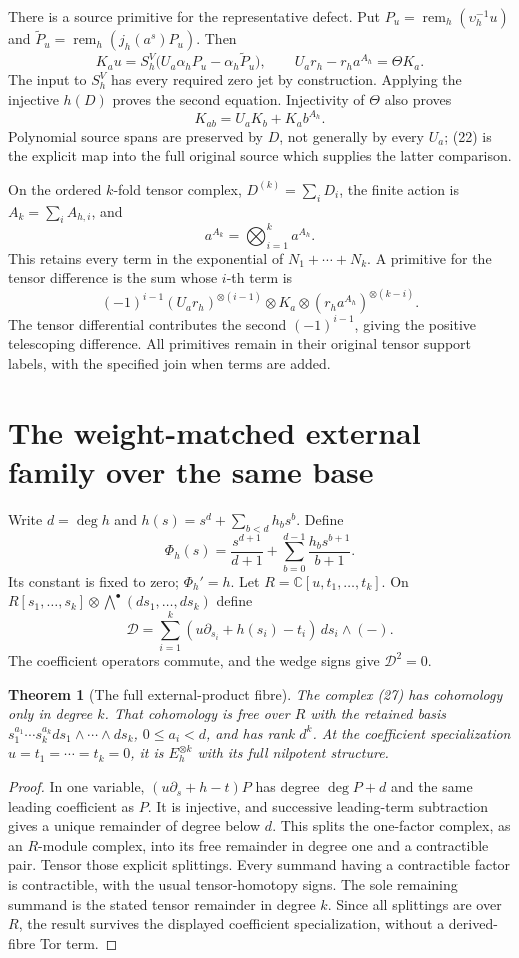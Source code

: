 \documentclass[11pt,a4paper]{article}
\newtheorem{theorem}{Theorem}[section]
\begin{document}
There is a source primitive for the representative defect. Put $P_u=\operatorname{rem}_h(\upsilon_h^{-1}u)$ and $\widetilde P_u=\operatorname{rem}_h(j_h(a^s)P_u)$. Then
\[
 K_a u=S_h^V\bigl(U_a\alpha_hP_u-\alpha_h\widetilde P_u\bigr),
 \qquad U_ar_h-r_ha^{A_h}=\Theta K_a.
 \tag{22}
\]
The input to $S_h^V$ has every required zero jet by construction. Applying the injective $h(D)$ proves the second equation. Injectivity of $\Theta$ also proves
\[
 K_{ab}=U_aK_b+K_a b^{A_h}.
 \tag{23}
\]
Polynomial source spans are preserved by $D$, not generally by every $U_a$; (22) is the explicit map into the full original source which supplies the latter comparison.

On the ordered $k$-fold tensor complex, $D^{(k)}=\sum_iD_i$, the finite action is $A_k=\sum_iA_{h,i}$, and
\[
 a^{A_k}=\bigotimes_{i=1}^k a^{A_h}.
 \tag{24}
\]
This retains every term in the exponential of $N_1+\cdots+N_k$. A primitive for the tensor difference is the sum whose $i$-th term is
\[
 (-1)^{i-1}(U_ar_h)^{\otimes(i-1)}\otimes K_a
          \otimes(r_ha^{A_h})^{\otimes(k-i)}.
 \tag{25}
\]
The tensor differential contributes the second $(-1)^{i-1}$, giving the positive telescoping difference. All primitives remain in their original tensor support labels, with the specified join when terms are added.

\section{The weight-matched external family over the same base}
Write $d=\deg h$ and $h(s)=s^d+\sum_{b<d}h_bs^b$. Define
\[
 \Phi_h(s)=\frac{s^{d+1}}{d+1}+
           \sum_{b=0}^{d-1}\frac{h_bs^{b+1}}{b+1}.
 \tag{26}
\]
Its constant is fixed to zero; $\Phi_h'=h$. Let $R=\mathbb C[u,t_1,\ldots,t_k]$. On $R[s_1,\ldots,s_k]\otimes\bigwedge^\bullet(ds_1,\ldots,ds_k)$ define
\[
 \mathcal D=\sum_{i=1}^k
       (u\partial_{s_i}+h(s_i)-t_i)\,ds_i\wedge(-).
 \tag{27}
\]
The coefficient operators commute, and the wedge signs give $\mathcal D^2=0$.

\begin{theorem}[The full external-product fibre]
The complex (27) has cohomology only in degree $k$. That cohomology is free over $R$ with the retained basis $s_1^{a_1}\cdots s_k^{a_k}ds_1\wedge\cdots\wedge ds_k$, $0\le a_i<d$, and has rank $d^k$. At the coefficient specialization $u=t_1=\cdots=t_k=0$, it is $E_h^{\otimes k}$ with its full nilpotent structure.
\end{theorem}
\begin{proof}
In one variable, $(u\partial_s+h-t)P$ has degree $\deg P+d$ and the same leading coefficient as $P$. It is injective, and successive leading-term subtraction gives a unique remainder of degree below $d$. This splits the one-factor complex, as an $R$-module complex, into its free remainder in degree one and a contractible pair. Tensor those explicit splittings. Every summand having a contractible factor is contractible, with the usual tensor-homotopy signs. The sole remaining summand is the stated tensor remainder in degree $k$. Since all splittings are over $R$, the result survives the displayed coefficient specialization, without a derived-fibre Tor term.
\end{proof}
\end{document}
